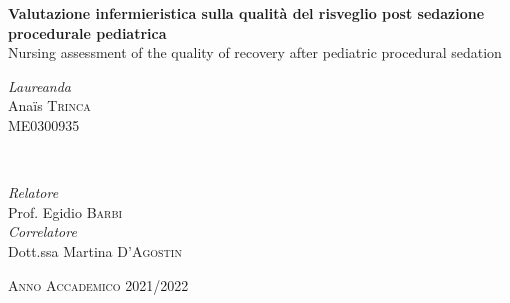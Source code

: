 \begin{titlepage}
\begin{center}
	
	\vfill
	
	{\huge\bfseries Valutazione infermieristica sulla qualità del risveglio post sedazione procedurale pediatrica}\\ [0.2cm] %
	
	{\huge Nursing assessment of the quality of recovery after pediatric procedural sedation}\\ [0.2cm] %
	
	\vfill\vfill
	
	
	\begin{minipage}{0.4\textwidth}
		\begin{flushleft}
			\large
			\textit{Laureanda}\\
			Ana\"is \textsc{Trinca}\\ %
			\small{ME0300935}
		\end{flushleft}
	\end{minipage}
	~
	\begin{minipage}{0.4\textwidth}
		\begin{flushright}
			\large
			\textit{Relatore}\\
			Prof. Egidio \textsc{Barbi} \\ %
			\bigskip
			\textit{Correlatore}\\ 
			Dott.ssa Martina \textsc{D'Agostin} \\ %
		\end{flushright}
	\end{minipage}
	
	
	\vfill\vfill\vfill
	
	{\large \textsc{Anno Accademico 2021/2022}}
	
	\vfill
	\end{center}
\end{titlepage}

